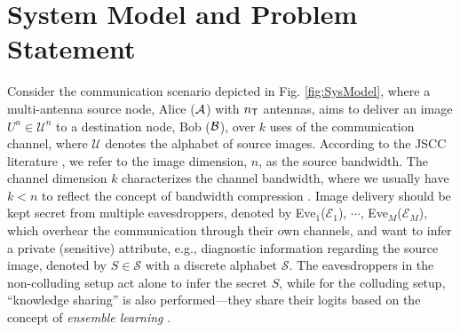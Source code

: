 \documentclass[conference]{IEEEtran}
\begin{document}
	\section{System Model and Problem Statement} \label{sec:System_Model}	 
    \vspace{-1mm}
	Consider the  communication scenario  depicted  in Fig. \ref{fig:SysModel}, where a multi-antenna source  node, Alice ({$\cal A$}) with $n_{\sf T}$ antennas, aims to  deliver an image {${U}^n \in \mathcal{U}^n$}  to a  destination  node, Bob ({$\cal B$}), 
	over $k$  uses of 
	the  communication  channel, 
  {where $\mathcal{U}$ denotes the alphabet of source images.}     
	According to the JSCC literature \cite{DJSCC-Deniz}, we refer to  the image dimension, $n$,  as the  {source bandwidth}.  The channel dimension $k$  characterizes  the {channel bandwidth}, where we  usually have  $k < n$ to reflect the concept of {bandwidth compression}  \cite{DJSCC-Deniz}.   
	Image delivery should be kept secret from multiple eavesdroppers, denoted by Eve$_{1}$($\mathcal{E}_1$), $\cdots$,  Eve$_{M}$($\mathcal{E}_M$), which overhear the communication through 
	their own channels,  
	and want  to infer a private (sensitive)  attribute, e.g., diagnostic information regarding the source image, denoted by  $S \in \mathcal{S}$ with a discrete alphabet $\mathcal{S}$. 
{The eavesdroppers in the non-colluding setup act alone to infer the secret $S$,  
	while for the colluding setup,  ``knowledge sharing'' is also performed---they share  their logits based on    the concept of \emph{ensemble learning} 
	\cite{ensemble}.}

	
	
\end{document}
